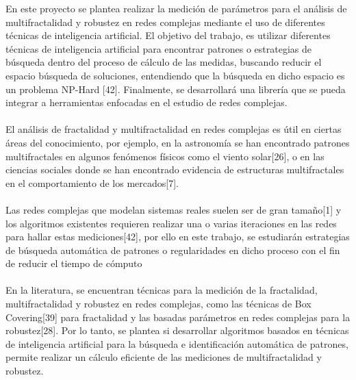 En este proyecto se plantea realizar la medición de parámetros para el análisis de multifractalidad y robustez en redes complejas mediante el uso de diferentes técnicas de inteligencia artificial. El objetivo del trabajo, es utilizar diferentes técnicas de inteligencia artificial para encontrar patrones o estrategias de búsqueda dentro del proceso de cálculo de las medidas, buscando reducir el espacio búsqueda de soluciones, entendiendo que la búsqueda en dicho espacio es un problema NP-Hard [42]. Finalmente, se desarrollará una librería que se pueda integrar a herramientas enfocadas en el estudio de redes complejas.
\\\\
El análisis de fractalidad y multifractalidad en redes complejas es útil en ciertas áreas del conocimiento, por ejemplo, en la astronomía se han encontrado patrones multifractales en algunos fenómenos físicos como el viento solar[26], o en las ciencias sociales donde se han
encontrado evidencia de estructuras multifractales en el comportamiento de los mercados[7].
\\\\
Las redes complejas que modelan sistemas reales suelen ser de gran tamaño[1] y los algoritmos existentes requieren realizar una o varias iteraciones en las redes para hallar estas mediciones[42], por ello en este trabajo, se estudiarán estrategias de búsqueda automática de
patrones o regularidades en dicho proceso con el fin de reducir el tiempo de cómputo
\\\\
En la literatura, se encuentran técnicas para la medición de la fractalidad, multifractalidad y robustez en redes complejas, como las técnicas de Box Covering[39] para fractalidad y las basadas parámetros en redes complejas para la robustez[28]. Por lo tanto, se plantea si desarrollar algoritmos basados en técnicas de inteligencia artificial para la búsqueda e identificación automática de patrones, permite realizar un cálculo eficiente de las mediciones de multifractalidad y robustez.


